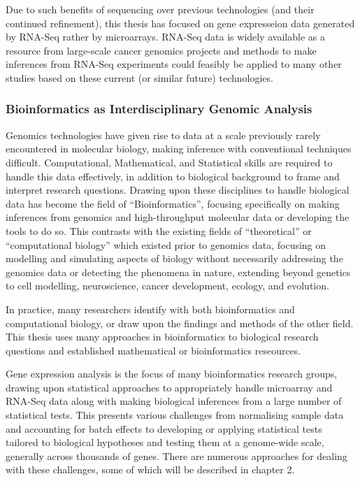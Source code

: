 Due to such benefits of sequencing over previous technologies (and their continued refinement), this thesis has focused on gene expresseion data generated by RNA-Seq rather by microarrays. RNA-Seq data is widely available as a resource from large-scale cancer genomics projects and methods to make inferences from RNA-Seq experiments could feasibly be applied to many other studies based on these current (or similar future) technologies.


\subsubsection{Bioinformatics as Interdisciplinary Genomic Analysis}
Genomics technologies have given rise to data at a scale previously rarely encountered in molecular biology, making inference with conventional techniques difficult. Computational, Mathematical, and Statistical skills are required to handle this data effectively, in addition to biological background to frame and interpret research questions. Drawing upon these disciplines to handle biological data has become the field of ``Bioinformatics'', focusing specifically on making inferences from genomics and high-throughput molecular data or developing the tools to do so. This contrasts with the existing fields of ``theoretical'' or ``computational biology'' which existed prior to genomics data, focusing on modelling and simulating aspects of biology without necessarily addressing the genomics data or detecting the phenomena in nature, extending beyond genetics to cell modelling, neuroscience, cancer development, ecology, and evolution.

In practice, many researchers identify with both bioinformatics and computational biology, or draw upon the findings and methods of the other field. This thesis uses many approaches in bioinformatics to biological research questions and established mathematical or bioinformatics reseources.

Gene expression analysis is the focus of many bioinformatics research groups, drawing upon statistical approaches to appropriately handle microarray and RNA-Seq data along with making biological inferences from a large number of statistical tests. This presents various challenges from normalising sample data and accounting for batch effects to developing or applying statistical tests tailored to biological hypotheses and testing them at a genome-wide scale, generally across thousands of genes. There are numerous approaches for dealing with these challenges, some of which will be described in chapter 2.

